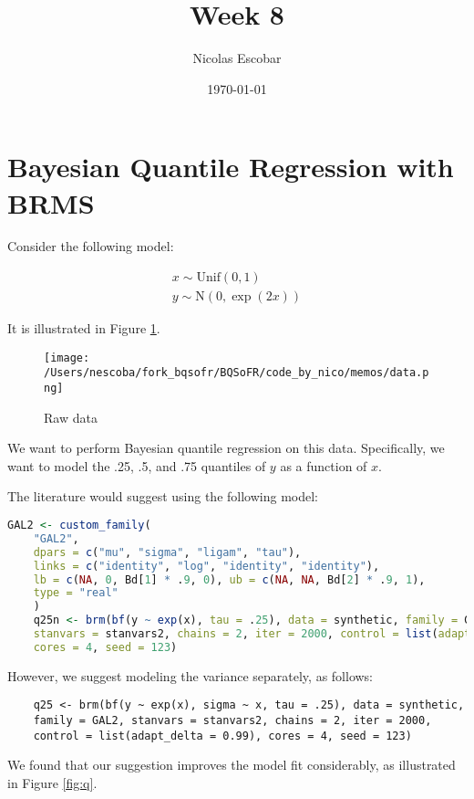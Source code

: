 \documentclass{article}
\title{Week 8}
\author{Nicolas Escobar}
\date{\today}
\begin{document}
\maketitle

\section{Bayesian Quantile Regression with BRMS}

Consider the following model:

\begin{align*}
    x \sim \mathrm{Unif} \left(0, 1\right) \\
    y \sim \mathrm{N} \left(0, \exp(2x)\right)
\end{align*}

It is illustrated in Figure \ref{fig:raw}.

\begin{figure}[ht]
    \centering
    \texttt{[image: /Users/nescoba/fork\_bqsofr/BQSoFR/code\_by\_nico/memos/data.png]}
    \caption{Raw data}
    \label{fig:raw}
\end{figure}

We want to perform Bayesian quantile regression on this data. 
Specifically, we want to model the .25, .5, and .75 quantiles of $y$ as a function of $x$.

The literature would suggest using the following model:

\begin{lstlisting}[language=R]
    GAL2 <- custom_family(
    "GAL2",
    dpars = c("mu", "sigma", "ligam", "tau"), 
    links = c("identity", "log", "identity", "identity"),
    lb = c(NA, 0, Bd[1] * .9, 0), ub = c(NA, NA, Bd[2] * .9, 1), 
    type = "real"
    )
    q25n <- brm(bf(y ~ exp(x), tau = .25), data = synthetic, family = GAL2, 
    stanvars = stanvars2, chains = 2, iter = 2000, control = list(adapt_delta = 0.99), 
    cores = 4, seed = 123)
\end{lstlisting}

However, we suggest modeling the variance separately, as follows:
\begin{lstlisting}
    q25 <- brm(bf(y ~ exp(x), sigma ~ x, tau = .25), data = synthetic, 
    family = GAL2, stanvars = stanvars2, chains = 2, iter = 2000, 
    control = list(adapt_delta = 0.99), cores = 4, seed = 123)
\end{lstlisting}

We found that our suggestion improves the model fit considerably, as illustrated in Figure \ref{fig:q}.
\end{document}
